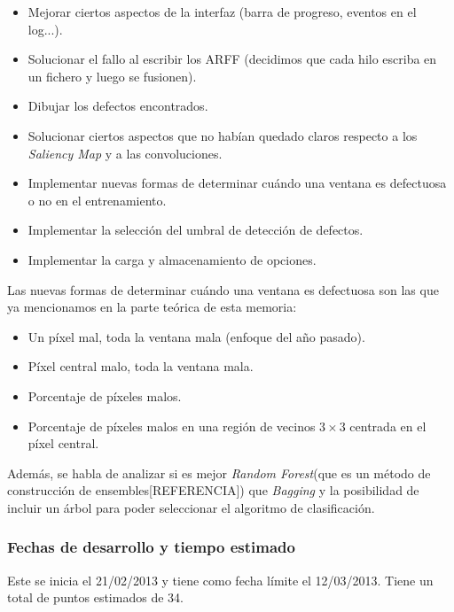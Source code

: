 \begin{itemize}
\item Mejorar ciertos aspectos de la interfaz (barra de progreso, eventos en el log...).
\item Solucionar el fallo al escribir los ARFF (decidimos que cada hilo escriba en un fichero y luego se fusionen).
\item Dibujar los defectos encontrados.
\item Solucionar ciertos aspectos que no habían quedado claros respecto a los \textit{Saliency Map} y a las convoluciones.
\item Implementar nuevas formas de determinar cuándo una ventana es defectuosa o no en el entrenamiento.
\item Implementar la selección del umbral de detección de defectos.
\item Implementar la carga y almacenamiento de opciones.
\end{itemize}

Las nuevas formas de determinar cuándo una ventana es defectuosa son las que ya mencionamos en la parte teórica de esta memoria:

\begin{itemize}
\item Un píxel mal, toda la ventana mala (enfoque del año pasado).
\item Píxel central malo, toda la ventana mala.
\item Porcentaje de píxeles malos.
\item Porcentaje de píxeles malos en una región de vecinos $3\times3$ centrada en el píxel central.
\end{itemize}

Además, se habla de analizar si es mejor \textit{Random Forest}(que es un método de construcción de ensembles[REFERENCIA]) que \textit{Bagging} y la posibilidad de incluir un árbol para poder seleccionar el algoritmo de clasificación.

\subsubsection*{Fechas de desarrollo y tiempo estimado}
Este \sprint{} se inicia el 21/02/2013 y tiene como fecha límite el 12/03/2013. Tiene un total de puntos estimados de 34.

